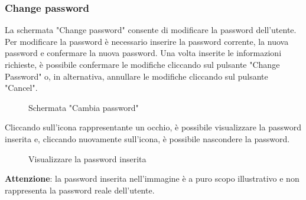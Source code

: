\subsubsection{Change password}
La schermata "Change password" consente di modificare la password dell'utente. Per modificare la password è necessario inserire la password corrente, la nuova password e confermare la nuova password. Una volta inserite le informazioni richieste, è possibile confermare le modifiche cliccando sul pulsante "Change Password" o, in alternativa, annullare le modifiche cliccando sul pulsante "Cancel". 
\begin{figure}[H]
    \centering
    \caption{Schermata "Cambia password"}
    \label{fig:my_label}
\end{figure}
Cliccando sull'icona rappresentante un occhio, è possibile visualizzare la password inserita e, cliccando nuovamente sull'icona, è possibile nascondere la password.
\begin{figure}[H]
    \centering
    \caption{Visualizzare la password inserita}
    \label{fig:my_label}
\end{figure}
\begin{center}
    \textbf{Attenzione}: la password inserita nell'immagine è a puro scopo illustrativo e non rappresenta la password reale dell'utente. \\
\end{center}
 